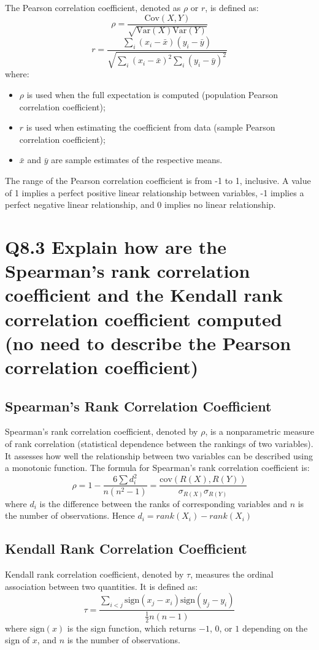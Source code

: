 \documentclass[11pt]{article}
\begin{document}
The Pearson correlation coefficient, denoted as \( \rho \) or \( r \), is defined as:
\[
\rho = \frac{\text{Cov}(X, Y)}{\sqrt{\text{Var}(X)\text{Var}(Y)}}
\]
\[
r = \frac{\sum_{i} (x_i - \bar{x})(y_i - \bar{y})}{\sqrt{\sum_{i} (x_i - \bar{x})^2 \sum_{i} (y_i - \bar{y})^2}}
\]
where:
\begin{itemize}
  \item \( \rho \) is used when the full expectation is computed (population Pearson correlation coefficient);
  \item \( r \) is used when estimating the coefficient from data (sample Pearson correlation coefficient);
  \item \( \bar{x} \) and \( \bar{y} \) are sample estimates of the respective means.
\end{itemize}

The range of the Pearson correlation coefficient is from -1 to 1, inclusive. A value of 1 implies a perfect positive linear relationship between variables, -1 implies a perfect negative linear relationship, and 0 implies no linear relationship.

\section{Q8.3 Explain how are the Spearman's rank correlation coefficient and the Kendall rank correlation coefficient computed (no need to describe the Pearson correlation coefficient)}


\subsection*{Spearman's Rank Correlation Coefficient}
Spearman's rank correlation coefficient, denoted by \(\rho\), is a nonparametric measure of rank correlation (statistical dependence between the rankings of two variables). It assesses how well the relationship between two variables can be described using a monotonic function. The formula for Spearman's rank correlation coefficient is:
\[
\rho = 1 - \frac{6 \sum d_i^2}{n(n^2 - 1)} = \frac{\text{cov}(R(X), R(Y))}{\sigma_{R(X)} \sigma_{R(Y)}}
\]
where \(d_i\) is the difference between the ranks of corresponding variables and \(n\) is the number of observations.
Hence $d_i = rank(X_i) - rank(X_i)$
\subsection*{Kendall Rank Correlation Coefficient}
Kendall rank correlation coefficient, denoted by \(\tau\), measures the ordinal association between two quantities. It is defined as:
\[
\tau = \frac{\sum_{i<j} \text{sign}(x_j - x_i) \text{sign}(y_j - y_i)}{\frac{1}{2} n(n-1)}
\]
where \(\text{sign}(x)\) is the sign function, which returns \(-1\), \(0\), or \(1\) depending on the sign of \(x\), and \(n\) is the number of observations.
\end{document}
